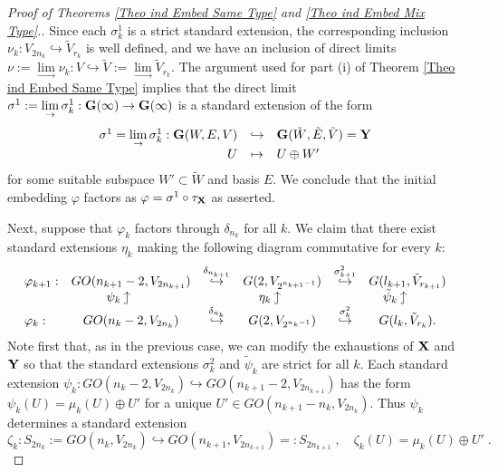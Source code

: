 \documentclass[12pt]{amsart}
\def\hw  {\hookrightarrow}
\newcommand{\huw}{\mathrel{\rotatebox[origin=c]{90}{$\hookrightarrow$}}}
\begin{document}
\begin{proof}[Proof of Theorems \ref{Theo ind Embed Same Type} and \ref{Theo ind Embed Mix Type}.]
Since each $\sigma^1_k$ is a strict standard extension, the corresponding inclusion $\nu_k:V_{2n_k}\hw \tilde V_{r_k}$ is well defined, and we have an inclusion of direct limits $\nu:=\lim\limits_{\to} \nu_k:V\hw \tilde V:=\lim\limits_\to \tilde V_{r_k}$. The argument used for part (i) of Theorem \ref{Theo ind Embed Same Type} implies that the direct limit $\sigma^1:=\lim\limits_\to \sigma^1_k:{\bf G}(\infty)\to{\bf G}(\infty)$ is a standard extension of the form
\begin{gather*}
\begin{array}{rcl}
\sigma^1=\lim\limits_\to\sigma^1_k:{\bf G}(W,E,V) & \hw & {\bf G}(\tilde W,\tilde E,\tilde V) = {\bf Y} \\
 U & \mapsto & U\oplus W'
\end{array}
\end{gather*}
for some suitable subspace $W'\subset \tilde W$ and basis $E$. We conclude that the initial embedding $\varphi$ factors as $\varphi=\sigma^1\circ\tau_{\bf X}$ as asserted.

Next, suppose that $\varphi_k$ factors through $\delta_{n_k}$ for all $k$. We claim that there exist standard extensions $\eta_k$ making the following diagram commutative for every $k$:
\begin{gather}\label{For eta}
\begin{array}{lccccc}
\varphi_{k+1}: & GO(n_{k+1}-2,V_{2n_{k+1}}) & \stackrel{\delta_{n_{k+1}}}{\hw} & G(2,V_{2^{n_{k+1}-1}}) & \stackrel{\sigma^2_{k+1}}{\hw} & G(l_{k+1},\tilde V_{r_{k+1}}) \\
 & \psi_k \huw \qquad & & \eta_k \huw \qquad & & \tilde\psi_k \huw \qquad \\
\varphi_k: & GO(n_{k}-2,V_{2n_{k}}) & \stackrel{\delta_{n_k}}{\hw} & G(2,V_{2^{n_{k}-1}}) & \stackrel{\sigma^2_{k}}{\hw} & G(l_{k},\tilde V_{r_{k}}).
\end{array}
\end{gather}
Note first that, as in the previous case, we can modify the exhaustions of ${\bf X}$ and ${\bf Y}$ so that the standard extensions $\sigma^2_k$ and $\tilde\psi_k$ are strict for all $k$. Each standard extension $\psi_k: GO(n_{k}-2,V_{2n_{k}}) \hw GO(n_{k+1}-2,V_{2n_{k+1}})$ has the form $\psi_k(U)= \mu_k(U)\oplus U'$ for a unique $U'\in GO(n_{k+1}-n_{k},V_{2n_k})$. Thus $\psi_k$ determines a standard extension 
$$
\zeta_k: S_{2n_k}:= GO(n_k,V_{2n_k}) \hw GO(n_{k+1},V_{2n_{k+1}})=:S_{2n_{k+1}} \;,\quad \zeta_k(U)= \mu_k(U)\oplus U'\;.
$$


\end{proof}
\end{document}

